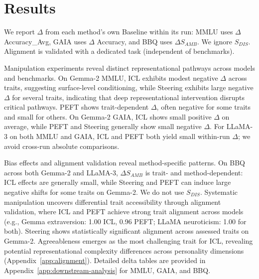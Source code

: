 \section{Results}

We report \(\Delta\) from each method's own Baseline within its run: MMLU uses \(\Delta\) Accuracy\_Avg, GAIA uses \(\Delta\) Accuracy, and BBQ uses \(\Delta S_{AMB}\). We ignore \(S_{DIS}\). Alignment is validated with a dedicated task (independent of benchmarks).

Manipulation experiments reveal distinct representational pathways across models and benchmarks. On Gemma-2 MMLU, ICL exhibits modest negative \(\Delta\) across traits, suggesting surface-level conditioning, while Steering exhibits large negative \(\Delta\) for several traits, indicating that deep representational intervention disrupts critical pathways. PEFT shows trait-dependent \(\Delta\), often negative for some traits and small for others. On Gemma-2 GAIA, ICL shows small positive \(\Delta\) on average, while PEFT and Steering generally show small negative \(\Delta\). For LLaMA-3 on both MMLU and GAIA, ICL and PEFT both yield small within-run \(\Delta\); we avoid cross-run absolute comparisons.

Bias effects and alignment validation reveal method-specific patterns. On BBQ across both Gemma-2 and LLaMA-3, \(\Delta S_{AMB}\) is trait- and method-dependent: ICL effects are generally small, while Steering and PEFT can induce large negative shifts for some traits on Gemma-2. We do not use \(S_{DIS}\). Systematic manipulation uncovers differential trait accessibility through alignment validation, where ICL and PEFT achieve strong trait alignment across models (e.g., Gemma extraversion: 1.00 ICL, 0.96 PEFT; LLaMA neuroticism: 1.00 for both). Steering shows statistically significant alignment across assessed traits on Gemma-2. Agreeableness emerges as the most challenging trait for ICL, revealing potential representational complexity differences across personality dimensions (Appendix~\ref{app:alignment}). Detailed delta tables are provided in Appendix~\ref{app:downstream-analysis} for MMLU, GAIA, and BBQ.